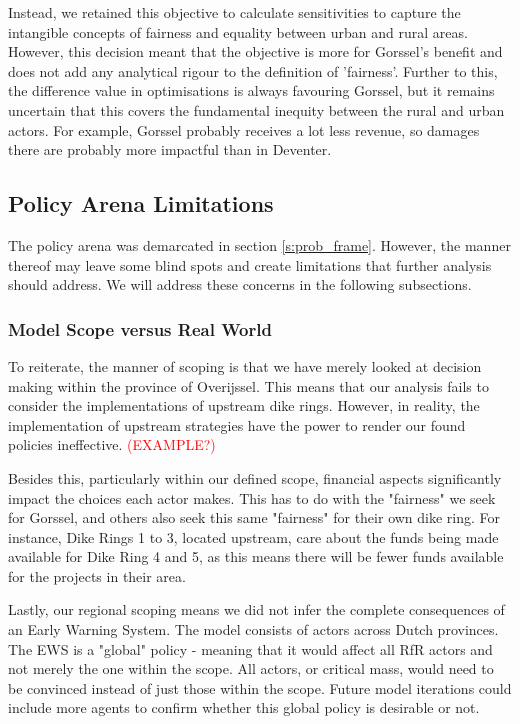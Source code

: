 Instead, we retained this objective to calculate sensitivities to capture the intangible concepts of fairness and equality between urban and rural areas. However, this decision meant that the objective is more for Gorssel's benefit and does not add any analytical rigour to the definition of 'fairness'. Further to this, the difference value in optimisations is always favouring Gorssel, but it remains uncertain that this covers the fundamental inequity between the rural and urban actors. For example, Gorssel probably receives a lot less revenue, so damages there are probably more impactful than in Deventer.


\subsection{Policy Arena Limitations}

The policy arena was demarcated in section \ref{s:prob_frame}. However, the manner thereof may leave some blind spots and create limitations that further analysis should address. We will address these concerns in the following subsections.  

\subsubsection{Model Scope versus Real World}
To reiterate, the manner of scoping is that we have merely looked at decision making within the province of Overijssel. This means that our analysis fails to consider the implementations of upstream dike rings. However, in reality, the implementation of upstream strategies have the power to render our found policies ineffective. 
\textcolor{red}{(EXAMPLE?)}

Besides this, particularly within our defined scope, financial aspects significantly impact the choices each actor makes. This has to do with the "fairness" we seek for Gorssel, and others also seek this same "fairness" for their own dike ring. For instance, Dike Rings 1 to 3, located upstream, care about the funds being made available for Dike Ring 4 and 5, as this means there will be fewer funds available for the projects in their area. 

Lastly, our regional scoping means we did not infer the complete consequences of an Early Warning System. The model consists of actors across Dutch provinces. The EWS is a "global" policy - meaning that it would affect all RfR actors and not merely the one within the scope. All actors, or critical mass, would need to be convinced instead of just those within the scope. Future model iterations could include more agents to confirm whether this global policy is desirable or not.


